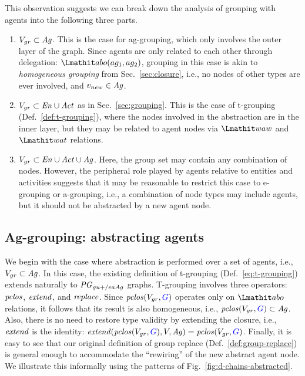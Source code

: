 This observation suggests we can break down the analysis of grouping with agents into the following three parts.
%
\begin{enumerate}
\item $V_{gr} \subset \mathit{Ag}$. This is the case for ag-grouping, which only involves the outer layer of the graph. Since agents are only related to each other through delegation: $\delegate(ag_1 , ag_2)$, grouping in this case is akin to \textit{homogeneous grouping} from Sec.~\ref{sec:closure}, i.e., no nodes of other types are ever involved, and $v_{new} \in \mathit{Ag}$. 

\item $V_{gr} \subset \mathit{En} \cup \mathit{Act}$ as in Sec.~\ref{sec:grouping}. This is the case of t-grouping (Def.~\ref{def:t-grouping}), where the nodes involved in the abstraction are in the inner layer, but they may be related to agent nodes via $\waw$ and $\wat$ relations.

\item $V_{gr} \subset \mathit{En} \cup \mathit{Act} \cup \mathit{Ag}$.  Here, the group set may contain any combination of nodes. However, the peripheral role played by agents relative to entities and activities suggests that it may be reasonable to restrict this case to e-grouping or a-grouping, i.e., a combination of node types may include agents, but it should not be abstracted by a new agent node.
%
\end{enumerate}



\subsection{Ag-grouping: abstracting agents}  \label{sec:ag-grouping}

We begin with the case where abstraction is performed over a set of agents, i.e., $V_{gr} \subset \mathit{Ag}$.
%
In this case, the existing definition of t-grouping (Def.~\ref{eq:t-grouping}) extends naturally to $\mathit{PG}_{gu+/eaAg}$ graphs.
%
%
T-grouping involves three operators: $\mathit{pclos}$, $\mathit{extend}$, and $\mathit{replace}$.
%
Since $\clos(V_{gr}, \jwb{G})$ operates only on $\delegate$ relations, it follows that its result is also homogeneous, i.e., $\clos(V_{gr}, \jwb{G}) \subset \ag$. Also, there is no need to restore type validity by extending the closure, i.e., $\mathit{extend}$ is the identity: $\extend(\clos(V_{gr},  \jwb{G}), V, \ag) = \clos(V_{gr},  \jwb{G})$.
%
Finally, it is easy to see that our original definition of group replace (Def.~\ref{def:group-replace}) is general enough to accommodate the ``rewiring'' of the new abstract agent node. 
%
We illustrate this informally using the patterns of Fig.~\ref{fig:d-chains-abstracted}.
%

